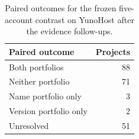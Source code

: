 \begin{table}[t]
\centering
\footnotesize
\caption{Paired outcomes for the frozen five-account contrast on YunoHost after the evidence follow-ups.}
\label{tab:consumer_paired_summary}
\begin{tabularx}{\linewidth}{@{}Yr@{}}
\toprule
Paired outcome & Projects\\
\midrule
Both portfolios & 88\\
Neither portfolio & 71\\
Name portfolio only & 3\\
Version portfolio only & 2\\
Unresolved & 51\\
\bottomrule
\end{tabularx}
\end{table}

